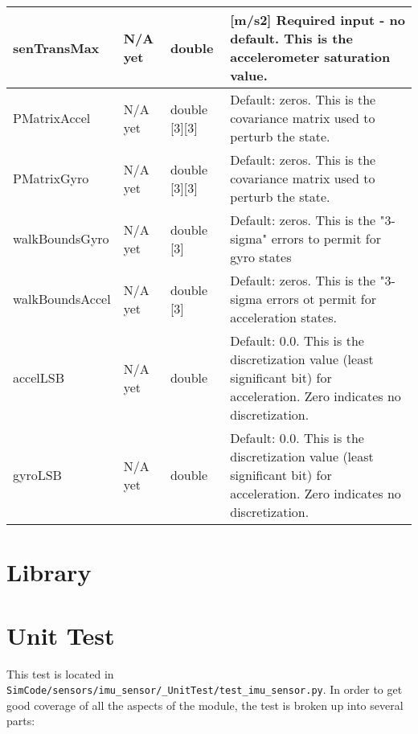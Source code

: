 \documentclass[]{BasiliskReportMemo}
\begin{document}
\begin{table}[H]
\begin{tabular}{ | m{3cm}| m{3cm} | m{3cm} | m{6cm} |}
		senTransMax & N/A yet & double & [m/s2] Required input - no default. This is the accelerometer saturation value. \\ \hline
		PMatrixAccel & N/A yet & double [3][3] & Default: zeros. This is the covariance matrix used to perturb the state. \\ \hline
		PMatrixGyro & N/A yet & double [3][3] & Default: zeros. This is the covariance matrix used to perturb the state. \\ \hline
		walkBoundsGyro & N/A yet& double [3] & Default: zeros. This is the "3-sigma" errors to permit for gyro states \\ \hline
		walkBoundsAccel & N/A yet & double [3] & Default: zeros. This is the "3-sigma errors ot permit for acceleration states. \\ \hline
		accelLSB & N/A yet & double & Default: 0.0. This is the discretization value (least significant bit) for acceleration. Zero indicates no discretization. \\ \hline
		gyroLSB & N/A yet & double & Default: 0.0. This is the discretization value (least significant bit) for acceleration. Zero indicates no discretization. \\ \hline
	\end{tabular}
	\label{tabular:vars}
\end{table}
\section{Library}


\section{Unit Test}

This test is located in {\tt SimCode/sensors/imu\_sensor/\_UnitTest/test\_imu\_sensor.py}. In order to get good coverage of all the aspects of the module, the test is broken up into several parts: \par
\end{document}
